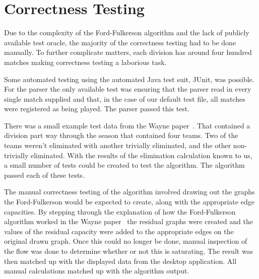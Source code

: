 \section{Correctness Testing}

Due to the complexity of the Ford-Fulkerson algorithm and the lack of
publicly available test oracle, the majority of the correctness testing had to
be done manually. To further complicate matters, each division has around four
hundred matches making correctness testing a laborious task.

Some automated testing using the automated Java test suit, JUnit, was possible.
For the parser the only available test was ensuring that the parser read in
every single match supplied and that, in the case of our default test file,
all matches were registered as being played. The parser passed this test.

There was a small example test data from the Wayne paper~\cite{Wayne}. That
contained a division part way through the season that contained four teams.
Two of the teams weren't eliminated with another trivially eliminated, and the
other non-trivially eliminated. With the results of the elimination calculation
known to us, a small number of tests could be created to test the algorithm.
The algorithm passed each of these tests.

The manual correctness testing of the algorithm involved drawing out the graphs
the Ford-Fulkerson would be expected to create, along with the appropriate
edge capacities. By stepping through the explanation of how the Ford-Fulkerson
algorithm worked in the Wayne paper~\cite{Wayne} the residual graphs were
created and the values of the residual capacity were added to the appropriate
edges on the original drawn graph. Once this could no longer be done, manual
inspection of the flow was done to determine whether or not this is saturating.
The result was then matched up with the displayed data from the desktop
application. All manual calculations matched up with the algorithm output.